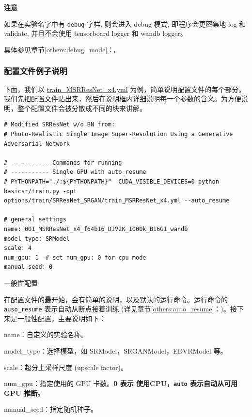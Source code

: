 \documentclass[../main.tex]{subfiles}
\begin{document}
\begin{hl} %
    \textbf{注意}

    如果在实验名字中有 \texttt{debug} 字样, 则会进入 debug 模式, 即程序会更密集地 log 和 validate, 并且不会使用 tensorboard logger 和 wandb logger。

    具体参见章节\ref{others:debug_mode}：。
\end{hl}

\subsubsection{配置文件例子说明}

下面，我们以 \href{https://github.com/XPixelGroup/BasicSR/blob/master/options/train/SRResNet_SRGAN/train_MSRResNet_x4.yml}{train\_MSRResNet\_x4.yml} 为例，简单说明配置文件的每个部分。我们先把配置文件贴出来，然后在说明框内详细说明每一个参数的含义。为方便说明，整个配置文件会被分散成不同的块来讲解。

\begin{verbatim}
# Modified SRResNet w/o BN from:
# Photo-Realistic Single Image Super-Resolution Using a Generative Adversarial Network

# ----------- Commands for running
# ----------- Single GPU with auto_resume
# PYTHONPATH="./:${PYTHONPATH}"  CUDA_VISIBLE_DEVICES=0 python basicsr/train.py -opt options/train/SRResNet_SRGAN/train_MSRResNet_x4.yml --auto_resume

# general settings
name: 001_MSRResNet_x4_f64b16_DIV2K_1000k_B16G1_wandb
model_type: SRModel
scale: 4
num_gpu: 1  # set num_gpu: 0 for cpu mode
manual_seed: 0
\end{verbatim}
\begin{exampleBox}[righthand ratio=0.00, sidebyside, sidebyside align=center, lower separated=false]{一般性配置}

在配置文件的最开始，会有简单的说明，以及默认的运行命令。运行命令的 \texttt{auso\_resume} 表示自动从断点接着训练 (详见章节\ref{others:auto_resume}：)。接下来是一般性配置，主要说明如下：

name：自定义的实验名称。

model\_type：选择模型，如 SRModel，SRGANModel，EDVRModel 等。

scale：超分上采样尺度 (upscale factor)。

num\_gpu：指定使用的 GPU 卡数。\textbf{0 表示 使用CPU，\texttt{auto} 表示自动从可用 GPU 推断}。

manual\_seed：指定随机种子。
\end{exampleBox}
\end{document}
